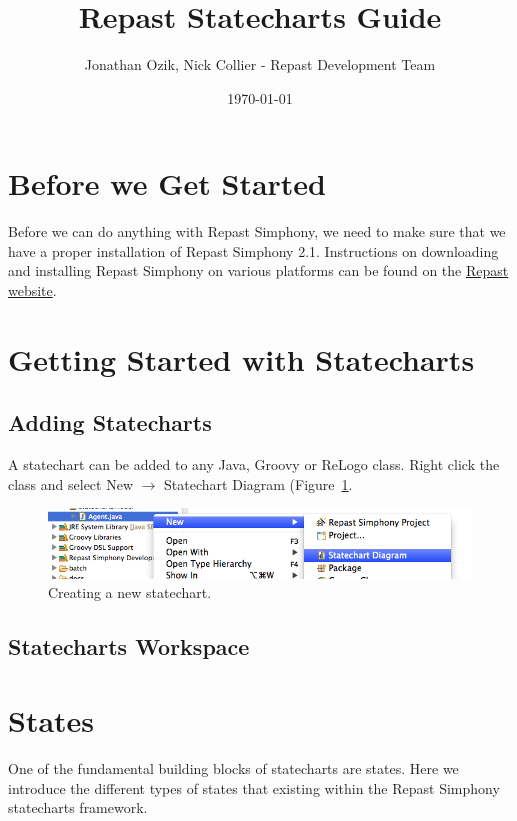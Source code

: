 \documentclass[11pt]{amsart}
\title{Repast Statecharts Guide}
\author{Jonathan Ozik, Nick Collier - Repast Development Team}
\date{\today}                                           %
\begin{document}
 
\maketitle
\setcounter{section}{-1}

\section{Before we Get Started}
Before we can do anything with Repast Simphony, we need to make sure that we have a proper installation of Repast Simphony 2.1. Instructions on downloading and installing Repast Simphony on various platforms can be found on the \href{http://repast.sourceforge.net/download.html}{Repast website}.

\section{Getting Started with Statecharts}

\subsection{Adding Statecharts}
A statechart can be added to any Java, Groovy or ReLogo class. Right click the class and select New $\rightarrow$ Statechart Diagram (Figure~\ref{fig:newStatechart}.

\begin{figure}
\begin{center}
\vspace{.2in}
\centerline {
\includegraphics[width=5in]{StatechartsImages/NewStatechart.png}
}
\caption{Creating a new statechart.}
\label{fig:newStatechart}
\end{center}
\end{figure}

\subsection{Statecharts Workspace}

\section{States}
One of the fundamental building blocks of statecharts are states. Here we introduce the different types of states that existing within the Repast Simphony statecharts framework.
\end{document}
